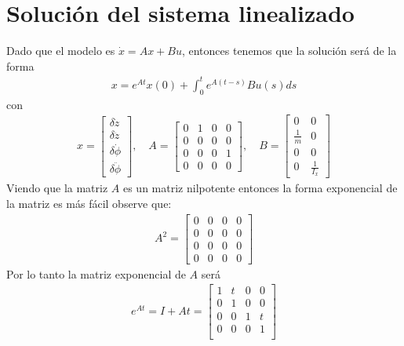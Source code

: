 \documentclass{uofa-eng-assignment}
\begin{document}
\section{Solución del sistema linealizado}
Dado que el modelo es $\dot{x} = Ax+Bu$, entonces tenemos que la solución será de la forma
\begin{align*}
    x = e^{At} x(0) + \int_0^t e^{A(t-s)} B  u(s) ds  
\end{align*}
con \begin{align*}
    x = \begin{bmatrix}
        \delta \dot{z} \\
        \delta \ddot{z} \\
        \delta \dot{\phi} \\
        \delta \ddot{\phi}
    \end{bmatrix}, \quad A = \begin{bmatrix}
        0 & 1 & 0 & 0 \\
        0 & 0 & 0 & 0 \\
        0 & 0 & 0 & 1 \\
        0 & 0 & 0 & 0
    \end{bmatrix}
, \quad B = \begin{bmatrix}
        0 & 0 \\
        \frac{1}{m} & 0 \\
        0 & 0 \\
        0 & \frac{1}{I_x}
    \end{bmatrix}
\end{align*}
Viendo que la matriz $A$ es un matriz nilpotente entonces la forma exponencial de la matriz es más fácil
observe que: 
\begin{align*}
    A ^2 = \begin{bmatrix}
        0& 0 & 0 & 0 \\
        0& 0 & 0 & 0 \\
        0& 0 & 0 & 0 \\
        0& 0 & 0 & 0 
    \end{bmatrix}
\end{align*}
Por lo tanto la matriz exponencial de $A$ será
\begin{align*}
    e^{At} = I+ At = \begin{bmatrix}
        1 & t & 0 & 0 \\
        0 & 1 & 0 & 0 \\
        0 & 0 & 1 & t \\
        0 & 0 & 0 & 1 \\
    \end{bmatrix}
\end{align*}
\end{document}
